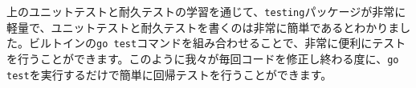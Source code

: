 上のユニットテストと耐久テストの学習を通じて、\texttt{testing}パッケージが非常に軽量で、ユニットテストと耐久テストを書くのは非常に簡単であるとわかりました。ビルトインの\texttt{go test}コマンドを組み合わせることで、非常に便利にテストを行うことができます。このように我々が毎回コードを修正し終わる度に、\texttt{go test}を実行するだけで簡単に回帰テストを行うことができます。
